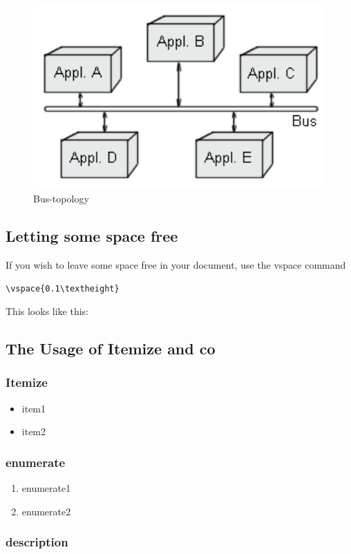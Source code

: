 \documentclass[12pt]{article}
\begin{document}
\begin{figure}[here!]
\begin{minipage}[h]{0.3\textwidth}
    \includegraphics[width=1.0\textwidth]{images/eai2.png}
    \caption{Bus-topology}
    \label{fig:eai2}
\end{minipage}
\end{figure}
\FloatBarrier
\subsection{Letting some space free}
If you wish to leave some space free in your document, use the vspace command
\begin{lstlisting}
\vspace{0.1\textheight}
\end{lstlisting}
This looks like this:
\vspace{0.1\textheight}
\subsection{The Usage of Itemize and co}
\subsubsection{Itemize}
\begin{itemize}
\item item1
\item item2
\end{itemize}
\subsubsection{enumerate}
\begin{enumerate}
\item enumerate1
\item enumerate2
\end{enumerate}
\subsubsection{description}
\end{document}
